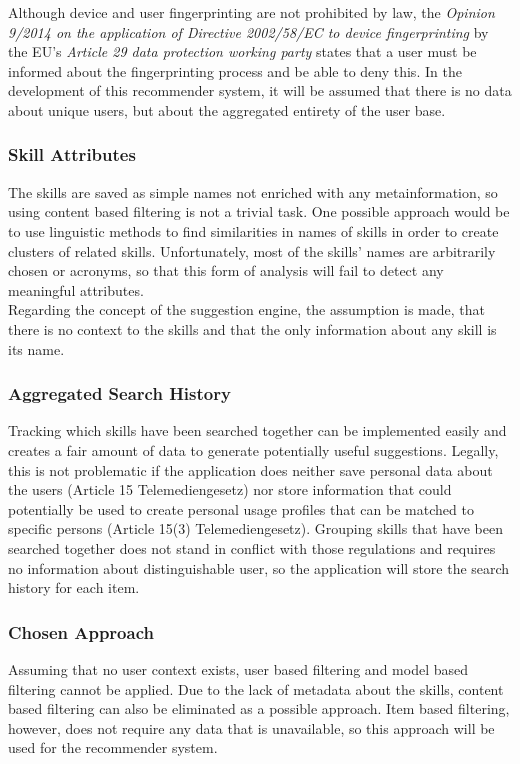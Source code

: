 Although device and user fingerprinting are not prohibited by law,
the \textit{Opinion 9/2014 on the application of Directive 2002/58/EC to device
fingerprinting} by the EU's \textit{Article 29 data protection working party} states that a user must be informed about the fingerprinting process and be able to deny this.
In the development of this recommender system, it will be assumed that there is no data about unique users, but about the aggregated entirety of the user base.

\newpage

\subsubsection{Skill Attributes}
The skills are saved as simple names not enriched with any metainformation, so using content based filtering is not a trivial task. One possible approach would be to use linguistic methods to find similarities in names of skills in order to create clusters of related skills. Unfortunately, most of the skills' names are arbitrarily chosen or acronyms, so that this form of analysis will fail to detect any meaningful attributes.\\
Regarding the concept of the suggestion engine, the assumption is made, that there is no context to the skills and that the only information about any skill is its name.

\subsubsection{Aggregated Search History}
Tracking which skills have been searched together can be implemented easily and creates a fair amount of data to generate potentially useful suggestions. Legally, this is not problematic if the application does neither save personal data about the users (Article 15 Telemediengesetz) nor store information that could potentially be used to create personal usage profiles that can be matched to specific persons (Article 15(3) Telemediengesetz). Grouping skills that have been searched together does not stand in conflict with those regulations and requires no information about distinguishable user, so the application will store the search history for each item.

\subsubsection{Chosen Approach}
Assuming that no user context exists, user based filtering and model based filtering cannot be applied. Due to the lack of metadata about the skills, content based filtering can also be eliminated as a possible approach. Item based filtering, however, does not require any data that is unavailable, so this approach will be used for the recommender system.

